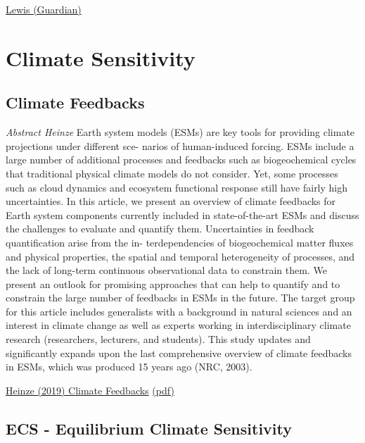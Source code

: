 \documentclass[
]{book}
\begin{document}
\href{https://www.theguardian.com/commentisfree/2021/mar/03/climate-crisis-carbon-accounting-tricks-big-finance}{Lewis (Guardian)}

\hypertarget{climate-sensitivity}{%
\chapter{Climate Sensitivity}\label{climate-sensitivity}}

\hypertarget{climate-feedbacks}{%
\section{Climate Feedbacks}\label{climate-feedbacks}}

\emph{Abstract Heinze}
Earth system models (ESMs) are key tools for providing climate projections under different sce-
narios of human-induced forcing. ESMs include a large number of additional processes and feedbacks such as
biogeochemical cycles that traditional physical climate models do not consider. Yet, some processes such as
cloud dynamics and ecosystem functional response still have fairly high uncertainties. In this article, we present
an overview of climate feedbacks for Earth system components currently included in state-of-the-art ESMs and
discuss the challenges to evaluate and quantify them. Uncertainties in feedback quantification arise from the in-
terdependencies of biogeochemical matter fluxes and physical properties, the spatial and temporal heterogeneity
of processes, and the lack of long-term continuous observational data to constrain them. We present an outlook
for promising approaches that can help to quantify and to constrain the large number of feedbacks in ESMs in
the future. The target group for this article includes generalists with a background in natural sciences and an
interest in climate change as well as experts working in interdisciplinary climate research (researchers, lecturers,
and students). This study updates and significantly expands upon the last comprehensive overview of climate
feedbacks in ESMs, which was produced 15 years ago (NRC, 2003).

\href{https://www.researchgate.net/publication/334387499_ESD_Reviews_Climate_feedbacks_in_the_Earth_system_and_prospects_for_their_evaluation}{Heinze (2019) Climate Feedbacks}
\href{pdf/Heinze_2019_Climate_Feedbacks.pdf}{(pdf)}

\hypertarget{ecs---equilibrium-climate-sensitivity}{%
\section{ECS - Equilibrium Climate Sensitivity}\label{ecs---equilibrium-climate-sensitivity}}
\end{document}
